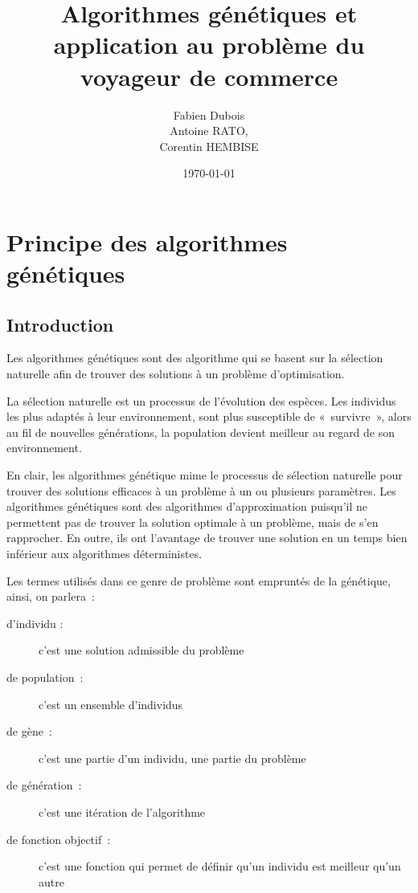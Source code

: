 \documentclass{article}
\begin{document}
\title{Algorithmes génétiques et application au problème du voyageur de commerce}
\author{Fabien Dubois\\
   Antoine RATO,\\
   Corentin HEMBISE	\\}
\date{\today}

\maketitle

\tableofcontents

\section{Principe des algorithmes génétiques}
	\subsection{Introduction}
	Les algorithmes génétiques sont des algorithme qui se basent sur la sélection naturelle afin de trouver des solutions à un problème d'optimisation. 

	La sélection naturelle est un processus de l'évolution des espèces. Les individus les plus adaptés à leur environnement, sont plus susceptible de « survivre », alors au fil de nouvelles générations, la population devient meilleur au regard de son environnement.

	En clair, les algorithmes génétique mime le processus de sélection naturelle pour trouver des solutions efficaces à un problème à un ou plusieurs paramètres.
	Les algorithmes génétiques sont des algorithmes d'approximation puisqu'il ne permettent pas de trouver la solution optimale à un problème, mais de s'en rapprocher. En outre, ils ont l'avantage de trouver une solution en un temps bien inférieur aux algorithmes déterministes.

	Les termes utilisés dans ce genre de problème sont empruntés de la génétique, ainsi, on parlera :
	\begin{description}
	\item [d'individu :] c'est une solution admissible du problème
	\item [de population :] c'est un ensemble d'individus
	\item [de gène :] c'est une partie d'un individu, une partie du problème
	\item [de génération :] c'est une itération de l'algorithme
	\item [de fonction objectif :] c'est une fonction qui permet de définir qu'un individu est meilleur qu'un autre
	\end{description}
\end{document}
